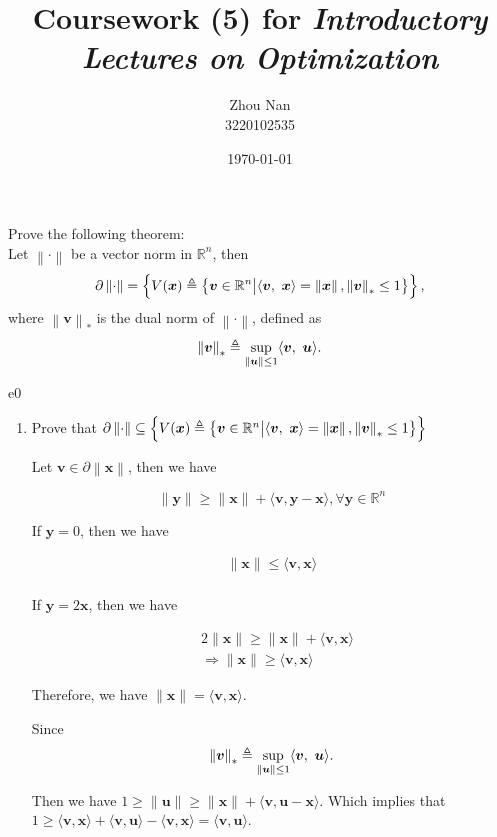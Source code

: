 \documentclass{article}
\title{Coursework (5) for \emph{Introductory Lectures on Optimization}}
\author{Zhou Nan \\ 3220102535}
\date{\today}
\newcommand{\xB}{\bm{x}}
\newcommand{\yB}{\bm{y}}
\newcommand{\vB}{\bm{v}}
\newcommand{\uB}{\bm{u}}
\newcommand{\RBB}{\mathbb{R}}
\newcommand{\normgen}[1]{\left\| #1 \right\|}
\begin{document}
\maketitle

\begin{excercise}\label{e0}
Prove the following theorem: \\
Let $\normgen{\cdot}$ be a vector norm in $\RBB^n$,  then 
\[
\partial \normgen{\cdot} = \left\{ V(\xB) \triangleq \left\{  \vB \in \RBB^n \big| \innerproduct{\vB}{\xB} = \normgen{\xB}, \normgen{\vB}_* \leq 1  \right\} \right\},
\]
where $\normgen{\vB}_*$ is the dual norm of $\normgen{\cdot}$, defined as
\[
\normgen{\vB}_* \triangleq \sup_{ \normgen{\uB} \leq 1} \innerproduct{\vB}{\uB}.
\]	
\end{excercise}
\begin{PROOF}{e0}
\begin{enumerate}
	\item Prove that $\partial \normgen{\cdot} \subseteq \left\{ V(\xB) \triangleq \left\{  \vB \in \RBB^n \big| \innerproduct{\vB}{\xB} = \normgen{\xB}, \normgen{\vB}_* \leq 1  \right\} \right\}$
	
	Let $\vB \in \partial \normgen{\xB}$, then we have

	\[
	\| \yB \| \geq \| \xB \| + \langle \vB, \yB - \xB \rangle, \forall \yB \in \RBB^n
	\]

	If $\yB = 0$, then we have

	\[
	\begin{aligned}
	\| \xB \| \leq \langle \vB, \xB \rangle \\
	\end{aligned}
	\]

	If $\yB = 2\xB$, then we have

	\[
	\begin{aligned}
	& 2 \| \xB \| \geq \| \xB \| + \langle \vB, \xB \rangle  \\
	& \Rightarrow  \| \xB \| \geq \langle \vB, \xB \rangle 
	\end{aligned}
	\]

	Therefore, we have $ \| \xB \| = \langle \vB, \xB \rangle $.

	Since 
	\[
		\normgen{\vB}_* \triangleq \sup_{ \normgen{\uB} \leq 1} \innerproduct{\vB}{\uB}.
	\]

	Then we have $1 \geq \| \uB \| \geq \| \xB \| + \langle \vB, \uB - \xB \rangle$.
	Which implies that $ 1 \geq \langle \vB, \xB \rangle + \langle \vB, \uB\rangle - \langle \vB, \xB \rangle = \langle \vB, \uB\rangle$.


\end{enumerate}
\end{PROOF}
\end{document}
